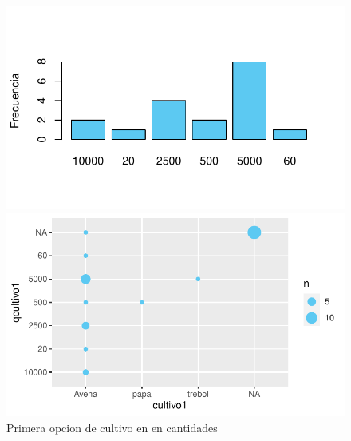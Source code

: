 \documentclass[12pt]{article}\usepackage[]{graphicx}\usepackage[]{xcolor}
\makeatletter
\def\maxwidth{ %
  \ifdim\Gin@nat@width>\linewidth
    \linewidth
  \else
    \Gin@nat@width
  \fi
}
\newenvironment{knitrout}{}{} %
\makeatother
\begin{document}
	\begin{figure}[H]
	\centering
\begin{knitrout}
\color{fgcolor}
\includegraphics[width=\maxwidth]{figure/eight-1} 

\includegraphics[width=\maxwidth]{figure/eight-2} 
\end{knitrout}
	\caption{Primera opcion de cultivo en \comunidad \- en cantidades}
	\end{figure}
	
\end{document}
